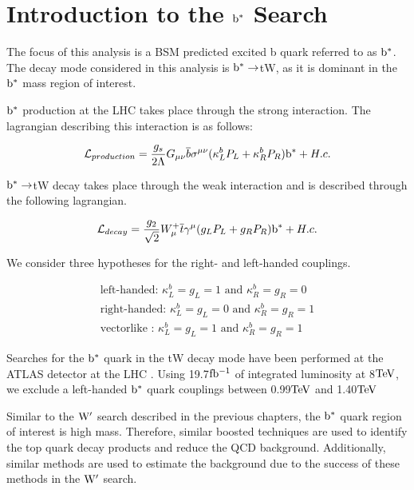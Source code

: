 \chapter{Introduction to the $\mathrm{b}^{*}$ Search}
\label{sec:bsintroduction}

The focus of this analysis is a BSM predicted \cite{Tait:2000sh} excited b quark referred to as $\mathrm{b}^{*}$.  
The decay mode considered in this analysis is $\mathrm{b}^{*} \to $tW, as it is dominant in the $\mathrm{b}^{*}$ mass region of interest.

$\mathrm{b}^{*}$ production at the LHC takes place through the strong interaction.  The lagrangian describing this interaction is as follows: 

\begin{eqnarray}
{\cal L}_{production} = \frac{g_s}{2\Lambda}G_{\mu\nu} \overline{b} \sigma^{\mu\nu} (\kappa^{b}_{L}P_L + \kappa^{b}_{R}P_R)\bs + H.c.
\label{eqn:Lag1}
\end{eqnarray}

$\mathrm{b}^{*} \to $tW decay takes place through the weak interaction and is described through the following lagrangian. 

\begin{eqnarray}
{\cal L}_{decay} = \frac{g_2}{\sqrt{2}}W^{+}_{\mu} \overline{t} \gamma^{\mu}(g_{L}P_L + g_{R}P_R)\bs + H.c.
\label{eqn:Lag2}
\end{eqnarray}

We consider three hypotheses for the right- and left-handed couplings.

\begin{eqnarray}
\text{left-handed: }\kappa^{b}_{L}=g_{L}=1 \text{ and } \kappa^{b}_{R}=g_{R}=0 \\
\text{right-handed: }\kappa^{b}_{L}=g_{L}=0 \text{ and } \kappa^{b}_{R}=g_{R}=1 \\
\text{vectorlike : }\kappa^{b}_{L}=g_{L}=1 \text{ and } \kappa^{b}_{R}=g_{R}=1 
\label{eqn:couplings}
\end{eqnarray}

Searches for the $\mathrm{b}^{*}$ quark in the tW decay mode have been performed at the ATLAS detector at the LHC \cite{Aad:2013rna}.  
Using 19.7$\mathrm{fb^{-1}}$ of integrated luminosity at 8$\mathrm{TeV}$, we exclude a left-handed $\mathrm{b}^{*}$ quark couplings between 0.99$\mathrm{TeV}$ and 1.40$\mathrm{TeV}$  

Similar to the $\mathrm{W}^{\prime}$ search described in the previous chapters, the $\mathrm{b}^{*}$ quark region of interest is high mass.  
Therefore, similar boosted techniques are used to identify the top quark decay products and reduce the QCD background.  
Additionally, similar methods are used to estimate the background due to the success of these methods in the $\mathrm{W}^{\prime}$ search.  

